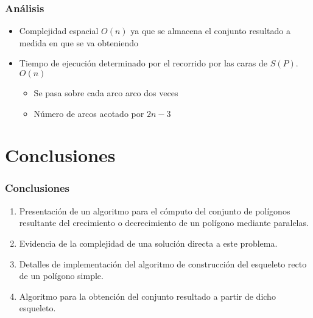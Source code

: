 \documentclass[notes=show]{beamer}
\begin{document}
\begin{frame}
\frametitle{An\'alisis}
\begin{itemize}
	\item<1->Complejidad espacial $O(n)$ ya que se almacena el conjunto resultado a medida en que se va obteniendo
	\item<2->Tiempo de ejecuci\'on determinado por el recorrido por las caras de $S(P)$. $O(n)$
	\begin{itemize}
	\item<3-> Se pasa sobre cada  arco arco dos veces 
	\item<4-> N\'umero de arcos acotado por $2n-3$
	\end{itemize}	
\end{itemize}
\transboxout[duration=0.4]
\end{frame}

\section{Conclusiones}

\begin{frame}
\frametitle{Conclusiones}
\begin{block}{}
\begin{enumerate}

\item<1-| alert@1> Presentaci\'on de un algoritmo para el c\'omputo del conjunto de pol\'igonos resultante del crecimiento o decrecimiento de un pol\'igono mediante paralelas.

\item<2-| alert@2>  Evidencia de la complejidad de una soluci\'on directa a este problema.
\item<3-| alert@3> Detalles de implementaci\'on del algoritmo de construcci\'on del esqueleto recto de un pol\'igono simple.

\item<4-| alert@4> Algoritmo para la obtenci\'on del conjunto resultado a partir de dicho esqueleto.  

\end{enumerate}
\end{block}
\transsplithorizontalout[duration=0.4]
\end{frame}	
\end{document}

